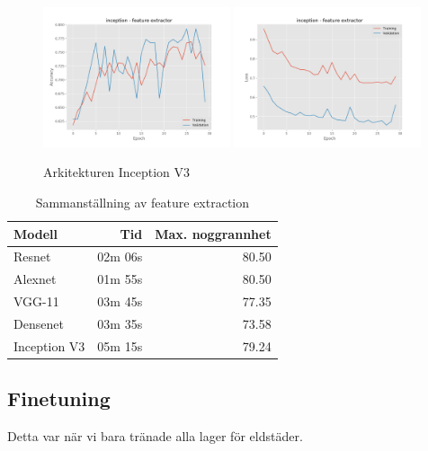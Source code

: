\documentclass{kththesis}
\begin{document}
  \begin{figure}
    \centering
    \includegraphics[width=0.49\textwidth]{"./fireplace/fireplace-classification - acc - inception - feature extractor"}
    \includegraphics[width=0.49\textwidth]{"./fireplace/fireplace-classification - loss - inception - feature extractor"}
    \caption{Arkitekturen Inception V3}
  \end{figure}

  \begin{table}
    \centering
    \begin{tabular}{|l|r|r|}
      Modell & Tid & Max. noggrannhet \\ 
      \hline
      Resnet       & 02m 06s & 80.50 \\
      Alexnet      & 01m 55s & 80.50 \\
      VGG-11       & 03m 45s & 77.35 \\
      Densenet     & 03m 35s & 73.58 \\
      Inception V3 & 05m 15s & 79.24 \\
    \end{tabular}
    \caption{Sammanställning av feature extraction}
  \end{table}

  \subsection{Finetuning}
  Detta var när vi bara tränade alla lager för eldstäder.
\end{document}
